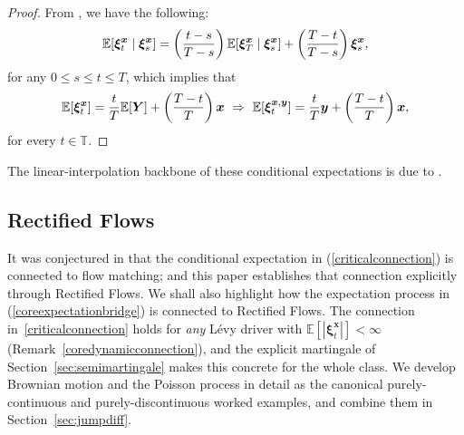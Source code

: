\documentclass{article}
\newcommand{\levy}{{L\'evy }}
\def\E{\mathbb{E}}
\def\T{\mathbb{T}}
\def\xib{\boldsymbol{\xi}}
\theoremstyle{definition}
\begin{document}
\begin{proof}
From \cite{hoylehughstonmacrina_2011}, we have the following:
\begin{align}
\mathbb{E}[\boldsymbol{\xi}^{\boldsymbol{x}}_t \mid \boldsymbol{\xi}^{\boldsymbol{x}}_s] = \left(\frac{t-s}{T-s}\right)\mathbb{E}[\boldsymbol{\xi}^{\boldsymbol{x}}_T \mid \boldsymbol{\xi}^{\boldsymbol{x}}_s] + \left(\frac{T-t}{T-s}\right) \boldsymbol{\xi}^{\boldsymbol{x}}_s, \notag
\end{align}
for any $0 \leq s \leq t \leq T$, which implies that
\begin{align}
\mathbb{E}[\boldsymbol{\xi}^{\boldsymbol{x}}_t] = \frac{t}{T}\mathbb{E}[\boldsymbol{Y}] + \left(\frac{T-t}{T}\right) \boldsymbol{x} \,\, \Rightarrow \,\, \mathbb{E}[\boldsymbol{\xi}^{\boldsymbol{x},\boldsymbol{y}}_t] = \frac{t}{T}\boldsymbol{y} + \left(\frac{T-t}{T}\right)\boldsymbol{x}, \notag
\end{align}
for every $t\in\T$.
\end{proof}
The linear-interpolation backbone of these conditional expectations is due to \cite[Corollary~2.10]{hoylehughstonmacrina_2011}.

\subsection{Rectified Flows}\label{sec:rf-connection}
It was conjectured in \cite{goria_random-bridges_2025} that the conditional expectation in (\ref{criticalconnection}) is connected to flow matching; and this paper establishes that connection explicitly through Rectified Flows. We shall also highlight how the expectation process in (\ref{coreexpectationbridge}) is connected to Rectified Flows. The connection in~\eqref{criticalconnection} holds for \emph{any} \levy driver with $\E[|\xib^{\boldsymbol{x}}_t|]<\infty$ (Remark~\ref{coredynamicconnection}), and the explicit martingale of Section~\ref{sec:semimartingale} makes this concrete for the whole class. We develop Brownian motion and the Poisson process in detail as the canonical purely-continuous and purely-discontinuous worked examples, and combine them in Section~\ref{sec:jumpdiff}.
\end{document}
